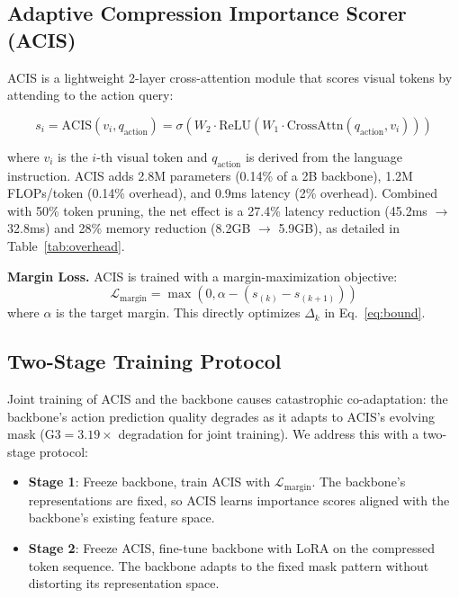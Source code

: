\documentclass[10pt,twocolumn]{article}
\begin{document}
\subsection{Adaptive Compression Importance Scorer (ACIS)}
\label{sec:acis}

ACIS is a lightweight 2-layer cross-attention module that scores visual tokens by attending to the action query:

\begin{equation}
s_i = \text{ACIS}(v_i, q_{\text{action}}) = \sigma(W_2 \cdot \text{ReLU}(W_1 \cdot \text{CrossAttn}(q_{\text{action}}, v_i)))
\end{equation}

where $v_i$ is the $i$-th visual token and $q_{\text{action}}$ is derived from the language instruction. ACIS adds 2.8M parameters (0.14\% of a 2B backbone), 1.2M FLOPs/token (0.14\% overhead), and 0.9ms latency (2\% overhead). Combined with 50\% token pruning, the net effect is a 27.4\% latency reduction (45.2ms $\rightarrow$ 32.8ms) and 28\% memory reduction (8.2GB $\rightarrow$ 5.9GB), as detailed in Table~\ref{tab:overhead}.

\textbf{Margin Loss.} ACIS is trained with a margin-maximization objective:
\begin{equation}
\mathcal{L}_{\text{margin}} = \max(0, \alpha - (s_{(k)} - s_{(k+1)}))
\end{equation}
where $\alpha$ is the target margin. This directly optimizes $\Delta_k$ in Eq.~\ref{eq:bound}.

\subsection{Two-Stage Training Protocol}
\label{sec:twostage}

Joint training of ACIS and the backbone causes catastrophic co-adaptation: the backbone's action prediction quality degrades as it adapts to ACIS's evolving mask (G3${=}3.19\times$ degradation for joint training). We address this with a two-stage protocol:

\begin{itemize}
    \item \textbf{Stage 1}: Freeze backbone, train ACIS with $\mathcal{L}_{\text{margin}}$. The backbone's representations are fixed, so ACIS learns importance scores aligned with the backbone's existing feature space.
    \item \textbf{Stage 2}: Freeze ACIS, fine-tune backbone with LoRA on the compressed token sequence. The backbone adapts to the fixed mask pattern without distorting its representation space.
\end{itemize}
\end{document}
